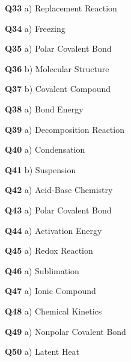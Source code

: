 \textbf{Q33} a) Replacement Reaction\par
\textbf{Q34} a) Freezing\par
\textbf{Q35} a) Polar Covalent Bond\par
\textbf{Q36} b) Molecular Structure\par
\textbf{Q37} b) Covalent Compound\par
\textbf{Q38} a) Bond Energy\par
\textbf{Q39} a) Decomposition Reaction\par
\textbf{Q40} a) Condensation\par
\textbf{Q41} b) Suspension\par
\textbf{Q42} a) Acid‑Base Chemistry\par
\textbf{Q43} a) Polar Covalent Bond\par
\textbf{Q44} a) Activation Energy\par
\textbf{Q45} a) Redox Reaction\par
\textbf{Q46} a) Sublimation\par
\textbf{Q47} a) Ionic Compound\par
\textbf{Q48} a) Chemical Kinetics\par
\textbf{Q49} a) Nonpolar Covalent Bond\par
\textbf{Q50} a) Latent Heat\par